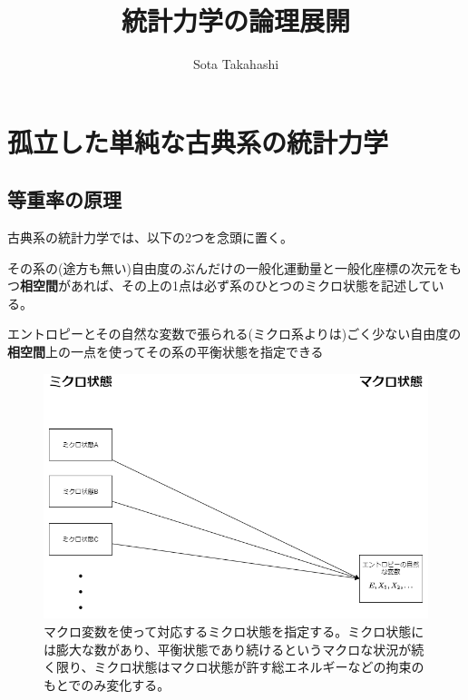 \documentclass[
]{ltjsbook}
\title{統計力学の論理展開}
\author{Sota Takahashi}
\date{}
\providecommand{\tightlist}{%
  \setlength{\itemsep}{0pt}\setlength{\parskip}{0pt}}
\begin{document}
\maketitle

\newpage

\hypertarget{ux5b64ux7acbux3057ux305fux5358ux7d14ux306aux53e4ux5178ux7cfbux306eux7d71ux8a08ux529bux5b66}{%
\section{孤立した単純な古典系の統計力学}\label{ux5b64ux7acbux3057ux305fux5358ux7d14ux306aux53e4ux5178ux7cfbux306eux7d71ux8a08ux529bux5b66}}

\hypertarget{ux7b49ux91cdux7387ux306eux539fux7406}{%
\subsection{等重率の原理}\label{ux7b49ux91cdux7387ux306eux539fux7406}}

古典系の統計力学では、以下の2つを念頭に置く。

\begin{description}
\tightlist
\item[\textbf{ミクロな状態}]
その系の(途方も無い)自由度のぶんだけの一般化運動量と一般化座標の次元をもつ\textbf{相空間}があれば、その上の1点は必ず系のひとつのミクロ状態を記述している。
\item[\textbf{マクロな状態}]
エントロピーとその自然な変数で張られる(ミクロ系よりは)ごく少ない自由度の\textbf{相空間}上の一点を使ってその系の平衡状態を指定できる
\end{description}

\begin{figure}
\hypertarget{fig:micro_macro}{%
\centering
\includegraphics{images/micro_macro.drawio.png}
\caption{マクロ変数を使って対応するミクロ状態を指定する。ミクロ状態には膨大な数があり、平衡状態であり続けるというマクロな状況が続く限り、ミクロ状態はマクロ状態が許す総エネルギーなどの拘束のもとでのみ変化する。}\label{fig:micro_macro}
}
\end{figure}
\end{document}
